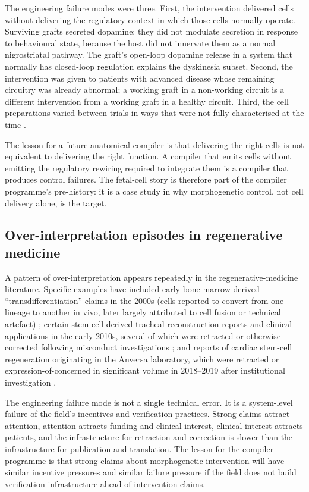 The engineering failure modes were three. First, the intervention
delivered cells without delivering the regulatory context in which
those cells normally operate. Surviving grafts secreted dopamine; they
did not modulate secretion in response to behavioural state, because
the host did not innervate them as a normal nigrostriatal pathway. The
graft's open-loop dopamine release in a system that normally has
closed-loop regulation explains the dyskinesia subset. Second, the
intervention was given to patients with advanced disease whose
remaining circuitry was already abnormal; a working graft in a
non-working circuit is a different intervention from a working graft
in a healthy circuit. Third, the cell preparations varied between
trials in ways that were not fully characterised at the time
\cite{paper:v6c13-barker-fetal-stemcell-2015}.

The lesson for a future anatomical compiler is that delivering the
right cells is not equivalent to delivering the right function. A
compiler that emits cells without emitting the regulatory rewiring
required to integrate them is a compiler that produces control
failures. The fetal-cell story is therefore part of the compiler
programme's pre-history: it is a case study in why morphogenetic
control, not cell delivery alone, is the target.

\subsection{Over-interpretation episodes in regenerative medicine}

A pattern of over-interpretation appears repeatedly in the
regenerative-medicine literature. Specific examples have included
early bone-marrow-derived ``transdifferentiation'' claims in the
2000s (cells reported to convert from one lineage to another in vivo,
later largely attributed to cell fusion or technical artefact)
\cite{paper:v6c13-wagers-transdiff-2004,
paper:v6c13-anversa-cardiac-stem-retraction}; certain stem-cell-derived
tracheal reconstruction reports and clinical applications in the early
2010s, several of which were retracted or otherwise corrected
following misconduct investigations
\cite{paper:v6c13-deluca-tissue-failure}; and reports of cardiac
stem-cell regeneration originating in the Anversa laboratory, which
were retracted or expression-of-concerned in significant volume in
2018--2019 after institutional investigation
\cite{paper:v6c13-anversa-cardiac-stem-retraction}.

The engineering failure mode is not a single technical error. It is a
system-level failure of the field's incentives and verification
practices. Strong claims attract attention, attention attracts funding
and clinical interest, clinical interest attracts patients, and the
infrastructure for retraction and correction is slower than the
infrastructure for publication and translation. The lesson for the
compiler programme is that strong claims about morphogenetic
intervention will have similar incentive pressures and similar failure
pressure if the field does not build verification infrastructure ahead
of intervention claims.


